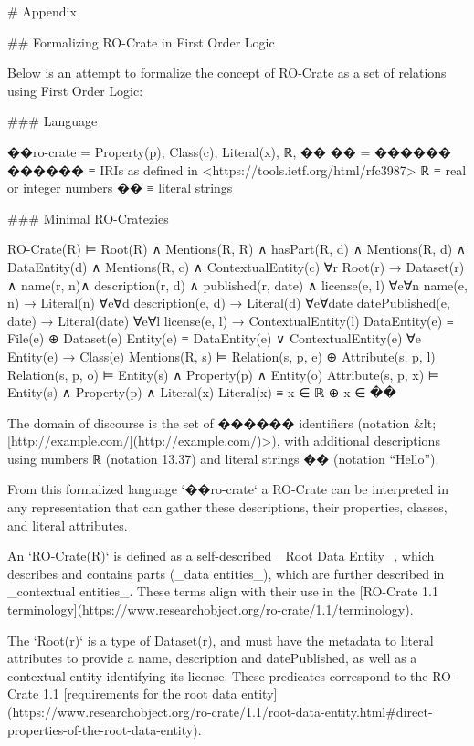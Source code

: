 # Appendix


## Formalizing RO-Crate in First Order Logic

Below is an attempt to formalize the concept of RO-Crate as a set of relations using First Order Logic:


### Language

    ��ro-crate = { Property(p), Class(c), Literal(x), ℝ, �� }
    �� =  ������
    ������ ≡  { IRIs as defined in <https://tools.ietf.org/html/rfc3987> }
    ℝ ≡  { real or integer numbers }
    �� ≡  { literal strings }

### Minimal RO-Cratezies

    RO-Crate(R) ⊨  Root(R) ∧ Mentions(R, R) ∧
        hasPart(R, d) ∧ Mentions(R, d) ∧ DataEntity(d) ∧
        Mentions(R, c) ∧ ContextualEntity(c)
    ∀r Root(r) →  Dataset(r) ∧ name(r, n)∧ description(r, d)
                            ∧ published(r, date) ∧ license(e, l)
    ∀e∀n name(e, n) →  Literal(n)
    ∀e∀d description(e, d) →  Literal(d)
    ∀e∀date datePublished(e, date) →  Literal(date)
    ∀e∀l license(e, l) →  ContextualEntity(l)
    DataEntity(e) ≡  File(e) ⊕ Dataset(e)
    Entity(e) ≡  DataEntity(e) ∨ ContextualEntity(e)
    ∀e Entity(e) → Class(e)
    Mentions(R, s) ⊨  Relation(s, p, e)  ⊕  Attribute(s, p, l)
    Relation(s, p, o) ⊨ Entity(s) ∧ Property(p) ∧ Entity(o)
    Attribute(s, p, x) ⊨ Entity(s)  ∧ Property(p) ∧ Literal(x)
    Literal(x) ≡  x ∈ ℝ  ⊕   x ∈ ��


The domain of discourse is the set of ������ identifiers (notation &lt;[http://example.com/](http://example.com/)>), with additional descriptions using numbers ℝ (notation 13.37) and literal strings �� (notation “Hello”). 

From this formalized language `��ro-crate` a RO-Crate can be interpreted in any representation that can gather these descriptions, their properties, classes, and literal attributes.  

An `RO-Crate(R)` is defined as a self-described _Root Data Entity_, which describes and contains parts (_data entities_), which are further described in _contextual entities_.  These terms align with their use in the [RO-Crate 1.1 terminology](https://www.researchobject.org/ro-crate/1.1/terminology). 

The `Root(r)` is a type of Dataset(r), and must have the metadata to literal attributes to provide a name, description and datePublished, as well as a contextual entity identifying its license. These predicates correspond to the RO-Crate 1.1 [requirements for the root data entity](https://www.researchobject.org/ro-crate/1.1/root-data-entity.html#direct-properties-of-the-root-data-entity).

